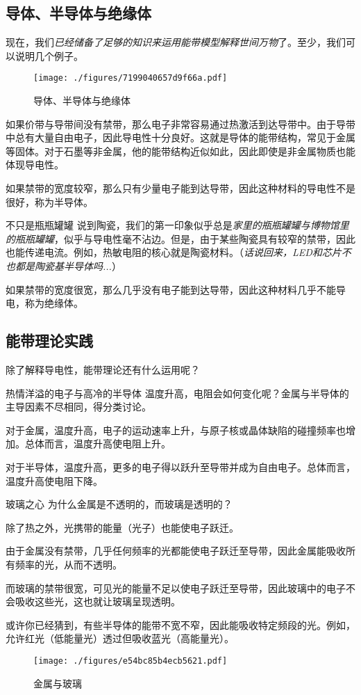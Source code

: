 \subsection{导体、半导体与绝缘体}
现在，我们\textsl{已经储备了足够的知识来运用能带模型解释世间万物}了。至少，我们可以说明几个例子。
\begin{figure}[ht]
\centering
\texttt{[image: ./figures/7199040657d9f66a.pdf]}
\caption{导体、半导体与绝缘体} \label{fig_BNDGP_9}
\end{figure}
如果价带与导带间没有禁带，那么电子非常容易通过热激活到达导带中。由于导带中总有大量自由电子，因此导电性十分良好。这就是导体的能带结构，常见于金属等固体。对于石墨等非金属，他的能带结构近似如此，因此即使是非金属物质也能体现导电性。

如果禁带的宽度较窄，那么只有少量电子能到达导带，因此这种材料的导电性不是很好，称为半导体。

\begin{example}{不只是瓶瓶罐罐}
说到陶瓷，我们的第一印象似乎总是\textsl{家里的瓶瓶罐罐与博物馆里的瓶瓶罐罐}，似乎与导电性毫不沾边。但是，由于某些陶瓷具有较窄的禁带，因此也能传递电流。例如，热敏电阻的核心就是陶瓷材料。（\textsl{话说回来，LED和芯片不也都是陶瓷基半导体吗...}）
\end{example}

如果禁带的宽度很宽，那么几乎没有电子能到达导带，因此这种材料几乎不能导电，称为绝缘体。

\subsection{能带理论实践}
除了解释导电性，能带理论还有什么运用呢？

\begin{example}{热情洋溢的电子与高冷的半导体}
温度升高，电阻会如何变化呢？金属与半导体的主导因素不尽相同，得分类讨论。

对于金属，温度升高，电子的运动速率上升，与原子核或晶体缺陷的碰撞频率也增加。总体而言，温度升高使电阻上升。

对于半导体，温度升高，更多的电子得以跃升至导带并成为自由电子。总体而言，温度升高使电阻下降。
\end{example}

\begin{example}{玻璃之心}
为什么金属是不透明的，而玻璃是透明的？

除了热之外，光携带的能量（光子）也能使电子跃迁。

由于金属没有禁带，几乎任何频率的光都能使电子跃迁至导带，因此金属能吸收所有频率的光，从而不透明。

而玻璃的禁带很宽，可见光的能量不足以使电子跃迁至导带，因此玻璃中的电子不会吸收这些光，这也就让玻璃呈现透明。

或许你已经猜到，有些半导体的能带不宽不窄，因此能吸收特定频段的光。例如，允许红光（低能量光）透过但吸收蓝光（高能量光）。

\begin{figure}[ht]
\centering
\texttt{[image: ./figures/e54bc85b4ecb5621.pdf]}
\caption{金属与玻璃} \label{fig_BNDGP_10}
\end{figure}
\end{example}
